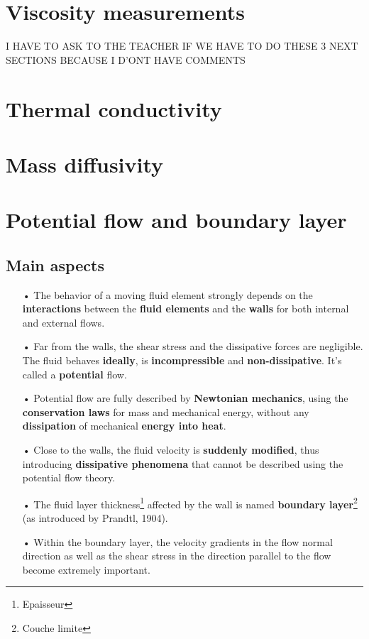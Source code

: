 \section{Viscosity measurements}
	I HAVE TO ASK TO THE TEACHER IF WE HAVE TO DO THESE 3 NEXT SECTIONS BECAUSE I D'ONT HAVE COMMENTS
	
\section{Thermal conductivity}
\section{Mass diffusivity}

\section{Potential flow and boundary layer}
\subsection{Main aspects}
	\begin{itemize}
	\item[•] The behavior of a moving fluid element strongly depends on the \textbf{interactions} between the \textbf{fluid elements} and the \textbf{walls} for both internal and external flows. \\
	
	\item[•] Far from the walls, the shear stress and the dissipative forces are negligible. The fluid behaves \textbf{ideally}, is \textbf{incompressible} and \textbf{non-dissipative}. It's called a \textbf{potential} flow. \\
	
	\item[•] Potential flow are fully described by \textbf{Newtonian mechanics}, using the \textbf{conservation laws} for mass and mechanical energy, without any \textbf{dissipation} of mechanical \textbf{energy into heat}. \\
	
	\item[•] Close to the walls, the fluid velocity is \textbf{suddenly modified}, thus introducing \textbf{dissipative phenomena} that cannot be described using the potential flow theory.
	
	\item[•] The fluid layer thickness\footnote{Epaisseur} affected by the wall is named \textbf{boundary layer}\footnote{Couche limite} (as introduced by Prandtl, 1904).\\
	
	\item[•] Within the boundary layer, the velocity gradients in the flow normal direction as well as the shear stress in the direction parallel to the flow become extremely important.
	\end{itemize}
	
